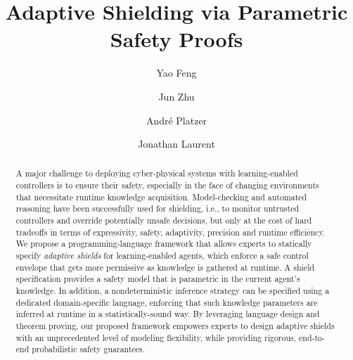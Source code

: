 \documentclass[acmsmall,screen,nonacm]{acmart}
\begin{document}
\title{Adaptive Shielding via Parametric Safety Proofs}

\author{Yao Feng}

\author{Jun Zhu}

\author{André Platzer}

\author{Jonathan Laurent}

\renewcommand{\shortauthors}{Feng, Zhu, Platzer and Laurent}

\begin{abstract}
  A major challenge to deploying cyber-physical systems with learning-enabled controllers is to ensure their safety, especially in the face of changing environments that necessitate runtime knowledge acquisition. Model-checking and automated reasoning have been successfully used for shielding, i.e., to monitor untrusted controllers and override potentially unsafe decisions, but only at the cost of hard tradeoffs in terms of expressivity, safety, adaptivity, precision and runtime efficiency. We propose a programming-language framework that allows experts to statically specify \emph{adaptive shields} for learning-enabled agents, which enforce a safe control envelope that gets more permissive as knowledge is gathered at runtime. A shield specification provides a safety model that is parametric in the current agent's knowledge. In addition, a nondeterministic inference strategy can be specified using a dedicated domain-specific language, enforcing that such knowledge parameters are inferred at runtime in a statistically-sound way. By leveraging language design and theorem proving, our proposed framework empowers experts to design adaptive shields with an unprecedented level of modeling flexibility, while providing rigorous, end-to-end probabilistic safety guarantees.
\end{abstract}
\end{document}
